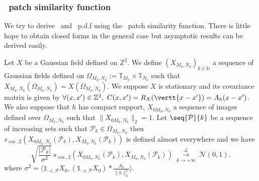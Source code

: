 \subsubsection{\scos \ patch
  similarity function} We try to derive \internalmatching \ and
\templatematching \ p.d.f using the \scos \ patch similarity function. There is
little hope to obtain closed forms in the general case but asymptotic results
can be derived easily.

\begin{prop}
  Let $X$ be a Gaussian field defined on $\mathbb{Z}^2$. We define
  $\left(X_{M_k,N_k}\right)_{k \in \mathbb{N}}$ a sequence of Gaussian fields
  defined on $\Omega_{M_k,N_k} := \mathbb{T}_{M_k} \times \mathbb{T}_{N_k}$ such
  that $X_{M_k,N_k}(\Omega_{M_k,N_k}) = X(\Omega_{M_k,N_k})$. We suppose $X$ is
  stationary and its covariance matrix is given by
  $\forall (x,x') \in \mathbb{Z}^2, \ C(x,x') = R_X(\vertt{x-x'}) = A_h(x-x')$. We
  also suppose that $h$ has compact support, $X_{0 M_k,N_k}$ a sequence of
  images defined over $\Omega_{M_k,N_k}$ such that $\| X_{0 M_k,N_k} \|_2 =
  1$. Let $\seq{\mathcal{P}}{k}$ be a sequence of increasing sets such that
  $\mathcal{P}_k \in \Omega_{M_k,N_k}$ then
  $s_{\cos,2}(X_{0 M_k,N_k}(\mathcal{P}_k), X_{M_k,N_k}(\mathcal{P}_k))$ is
  defined almost everywhere and we have
  \[
    \sqrt{\frac{\vert \mathcal{P}_k \vert}{\sigma^2}} \ s_{\cos,2}(X_{0
      M_k,N_k}(\mathcal{P}_k), X_{M_k,N_k}(\mathcal{P}_k)) \
    \overset{\mathcal{L}}{\underset{k \rightarrow +\infty}{\longrightarrow}} \
    \mathcal{N}(0,1).
  \]
  where
  $\sigma^2 = \langle \mathbb{1}_{\cdot \in \mathcal{P}}X_0,
  \left(\mathbb{1}_{\cdot \in \mathcal{P}}X_0\right) * \frac{A_h}{\| h \|_2^2}\rangle$.
  \label{p:angle_pdf}
\end{prop}
